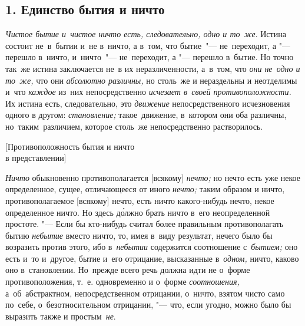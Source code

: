 
\subsection[1. Единство бытия и ничто]{1. Единство бытия и ничто}

{\em Чистое бытие и~чистое ничто есть, следовательно, одно и то~же}. Истина
состоит не~в~бытии и~не в~ничто, а в~том, что бытие~"--- не~переходит, а "---
перешло в~ничто, и~ничто~"--- не~переходит, а "--- перешло в~бытие. Но точно
так~же истина заключается не~в их неразличенности, а~в~том, что
{\em они не~одно и то~же,} что они {\em абсолютно различны,} но столь~же и
нераздельны и неотделимы и~что {\em каждое} из~них непосредственно
{\em исчезает в~своей противоположности.} Их истина есть, следовательно, это
{\em движение} непосредственного исчезновения одного в другом:
{\em становление;} такое~движение, в~котором они оба различны,
но~таким~различием, которое столь~же непосредственно растворилось.

%
{[Противоположность бытия и ничто\nopagebreak\\в представлении]}

{\em Ничто} обыкновенно противополагается [всякому] {\em нечто;} но нечто есть
уже некое определенное, сущее, отличающееся от иного {\em нечто;} таким образом
и ничто, противополагаемое [всякому] нечто, есть ничто какого-нибудь нечто,
некое определенное ничто. Но здесь д\'{о}лжно брать ничто в~его неопределенной
простоте. "--- Если бы кто-нибудь считал более правильным противополагать бытию
{\em небытие} вместо ничто, то, имея в~виду результат, нечего было бы возразить
против этого, ибо в~{\em небытии} содержится соотношение с~{\em бытием;} оно
есть и~то и~другое, бытие и~его отрицание, высказанные в~{\em одном,} ничто,
каково оно в~становлении. Но~прежде всего речь должна идти не о~форме
противоположения, т.~е. одновременно и о~форме {\em соотношения,}
а~об~абстрактном, непосредственном отрицании, о~ничто, взятом чисто само
по~себе, о~безотносительном отрицании, "--- что, если угодно, можно было бы
выразить также и простым~{\em не}.

